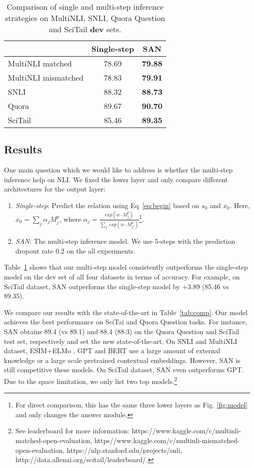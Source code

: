 \documentclass[11pt,a4paper]{article}
\begin{document}
\begin{table}[t!]
\centering
\begin{tabular}{@{\hskip1pt}l || c | c  }
\hline
 & Single-step & SAN \\\hline
MultiNLI matched & 78.69 & \textbf{79.88} \\
MultiNLI mismatched & 78.83 & \textbf{79.91} \\ \hline 
SNLI & 88.32 & \textbf{88.73} \\ \hline
Quora & 89.67 & \textbf{90.70} \\ \hline
SciTail &85.46  & \textbf{89.35} \\ \hline
\end{tabular}
\caption{\label{tab:main} Comparison of single and multi-step inference strategies on MultiNLI, SNLI, Quora Question and SciTail \textbf{dev} sets.}
\end{table}



\subsection{Results}
\label{sec:result}
One main question which we would like to address is whether the multi-step inference help on NLI. 
We fixed the lower layer and only compare different architectures for the output layer:\begin{enumerate}
\item \textit{Single-step}: Predict the relation using Eq~\ref{eq:begin} based on $s_0$ and $x_0$. Here, $x_0=\sum_j \alpha_j M^p_{j}$, where $\alpha_j = \frac{exp(w \cdot M^p_j)}{\sum_{j'}exp(w \cdot M^p_{j'})}$\footnote{For direct comparison, this has the same three lower layers as Fig. \ref{fig:model} and only changes the answer module.}.
\item \textit{SAN}: The multi-step inference model. We use 5-steps with the prediction dropout rate $0.2$ on the all experiments.
\end{enumerate} 



Table~\ref{tab:main} shows that our multi-step model consistently outperforms the single-step model on the dev set of all four datasets in terms of accuracy. For example, on SciTail dataset, SAN outperforms the single-step model by +3.89 (85.46 vs 89.35). 

We compare our results with the state-of-the-art in Table~\ref{tab:comp}. Our model achieves the best performance on SciTai and Quora Question tasks. For instance, SAN obtains 89.4 (vs 89.1) and 88.4 (88.3) on the Quora Question and SciTail test set, respectively and set the new state-of-the-art. On SNLI and MultiNLI dataset, ESIM+ELMo \cite{peters2018deep}, GPT \cite{radford2018improving} and BERT \cite{devlin2018bert} use a large amount of external knowledge or a large scale pretrained contextual embeddings. However, SAN is still competitive these models. On SciTail dataset, SAN even outperforms GPT.  
Due to the space limitation, we only list two top models.\footnote{See leaderboard for more information: https://www.kaggle.com/c/multinli-matched-open-evaluation, https//www.kaggle.com/c/multinli-mismatched-open-evaluation, https://nlp.stanford.edu/projects/snli, http://data.allenai.org/scitail/leaderboard/.}
\end{document}
